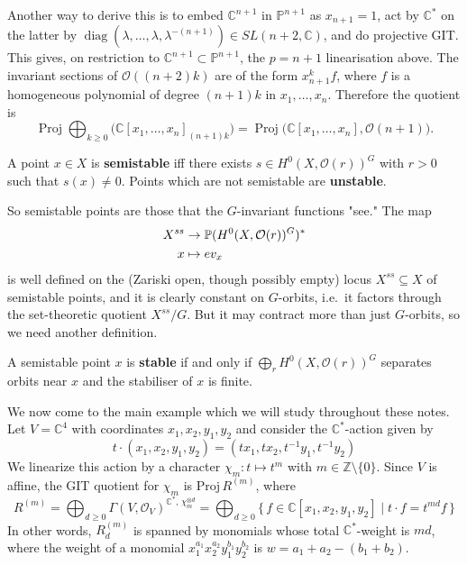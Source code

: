 \documentclass[12pt]{article}
\begin{document}
\begin{example}
  Another way to derive this is to embed $\mathbb{C}^{n+1}$ in $\mathbb{P}^{n+1}$ as
  $x_{n+1}=1$, act by $\mathbb{C}^*$ on the latter by
  $\operatorname{diag}(\lambda,\dots,\lambda,\lambda^{-(n+1)}) \in SL(n+2,\mathbb{C})$,
  and do projective GIT. This gives, on restriction to $\mathbb{C}^{n+1} \subset \mathbb{P}^{n+1}$,
  the $p=n+1$ linearisation above. The invariant sections of $\mathcal{O}((n+2)k)$ are of the form
  $x_{n+1}^k f$, where $f$ is a homogeneous polynomial of degree $(n+1)k$ in $x_1,\dots,x_n$.
  Therefore the quotient is
  \[
    \operatorname{Proj} \bigoplus_{k\ge 0}
    \big(\mathbb{C}[x_1,\dots,x_n]_{(n+1)k}\big) = \operatorname{Proj} \big(\mathbb{C}[x_1,\dots,x_n],\mathcal{O}(n+1)\big).
  \]
\end{example}


\begin{definition}
  A point $x \in X$ is \textbf{semistable} iff there exists
  $s \in H^0(X,\mathcal{O}(r))^G$ with $r>0$ such that $s(x) \neq 0$. Points which are not
  semistable are \textbf{unstable}.
\end{definition}
So semistable points are those that the $G$-invariant functions "see." The map \begin{align*}
  X^{ss} & \to \P(H^0(X,\mathcal{O}(r))^G)^* \\
  x      & \mapsto ev_x
\end{align*} is well defined on the (Zariski open, though possibly empty) locus $X^{ss} \subseteq X$ of semistable points, and it is clearly constant on $G$-orbits,
i.e.~it factors through the set-theoretic quotient $X^{ss}/G$. But it may contract more
than just $G$-orbits, so we need another definition.

\begin{definition}
  A semistable point $x$ is \textbf{stable} if and only if
  $\bigoplus_r H^0(X,\mathcal{O}(r))^G$ separates orbits near $x$ and the stabiliser of $x$ is finite.
\end{definition}

We now come to the main example which we will study throughout these notes. Let $V = \mathbb{C}^4$ with coordinates $x_1,x_2,y_1,y_2$ and consider the $\mathbb{C}^*$-action given by
\[
  t\cdot(x_1,x_2,y_1,y_2)=(t x_1, t x_2, t^{-1}y_1, t^{-1}y_2)
\]
We linearize this action by a character $\chi_m:t\mapsto t^m$ with $m\in\mathbb{Z}\setminus\{0\}$. Since $V$ is affine, the GIT quotient for $\chi_m$ is $\mathrm{Proj}\,R^{(m)}$, where
\[
  R^{(m)}=\bigoplus_{d\ge 0} \Gamma(V,\mathcal{O}_V)^{\mathbb{C}^*,\,\chi_m^{\otimes d}}=\bigoplus_{d\ge 0}\{\,f\in\mathbb{C}[x_1,x_2,y_1,y_2]\mid t\cdot f = t^{md} f\,\}
\]
In other words, $R^{(m)}_d$ is spanned by monomials whose total $\mathbb{C}^*$-weight is $md$, where the weight of a monomial $x_1^{a_1}x_2^{a_2}y_1^{b_1}y_2^{b_2}$ is $w=a_1+a_2-(b_1+b_2)$.
\end{document}

